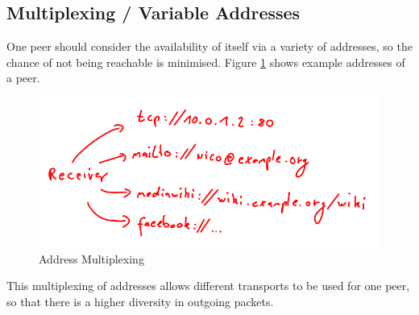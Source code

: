 \subsection{Multiplexing / Variable Addresses}
\label{multiplexing}
One peer should consider the availability of itself via a variety
of addresses, so the chance of not being reachable is minimised.
Figure \ref{addressmultiplexing} shows example addresses
of a peer.
\begin{figure}
    \centering
    \caption{Address Multiplexing}
    \label{addressmultiplexing}
    \includegraphics[scale=0.8]{addressmultiplexing.png}
\end{figure}
This multiplexing of addresses allows different transports to be used
for one peer, so that there is a higher diversity in outgoing packets.
